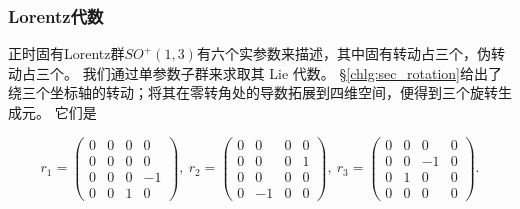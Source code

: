 \subsubsection{Lorentz代数}
正时固有Lorentz群$SO^{+}(1,3)$有六个实参数来描述，其中固有转动占三个，伪转动占三个。
我们通过单参数子群来求取其 Lie 代数。
\S\ref{chlg:sec_rotation}给出了绕三个坐标轴的转动；将其在零转角处的导数拓展到四维空间，便得到三个旋转生成元。
它们是
\begin{small}
\begin{equation}\label{chlg:eqn_LA-so13-r}
    r_1=\begin{pmatrix}
        0&0&0&0\\
        0&0 & 0 & 0 \\
        0&0& 0 & -1 \\
        0&0 & 1 & 0
    \end{pmatrix},\
    r_2=\begin{pmatrix}
        0&0&0&0\\
        0&0 & 0 & 1 \\
        0&0 & 0 & 0 \\
        0&-1 & 0 & 0
    \end{pmatrix},\
    r_3=\begin{pmatrix}
        0&0&0&0\\
        0&0 & - 1 & 0 \\
        0&1& 0 & 0 \\
        0&0 & 0 & 0
    \end{pmatrix} .
\end{equation}
\end{small}

